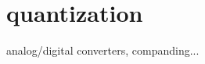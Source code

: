 % 
%

\newpage
\section{quantization}
\label{module:quantization}
analog/digital converters, companding...

